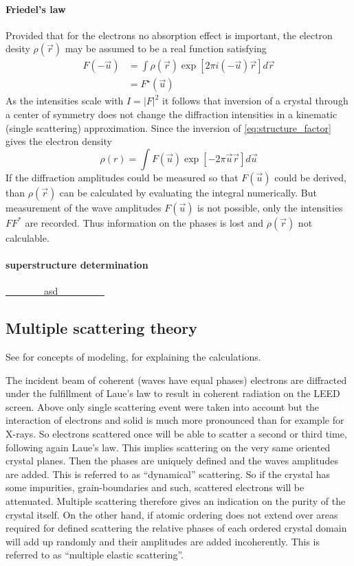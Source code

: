 \paragraph{Friedel's law}\cite[93]{cowley_diffraction_1981}
Provided that for the electrons no absorption effect is important, the electron desity $\rho(\vec r)$ may be assumed to be a real function satisfying \begin{align}
F(-\vec u) &= \int \rho(\vec r) \exp{[2\pi i(-\vec u)\vec r]} d\vec r \\                                                                                                                                                      &=F^\star(\vec u)                                                                                                                                                      \end{align}
As the intensities scale with $I=|F|^2$ it follows that inversion of a crystal through a center of symmetry does not change the diffraction intensities in a kinematic (single scattering) approximation. Since the inversion of \eqref{eq:structure_factor} gives the electron density $$\rho(r)=\int F(\vec u)\exp{[-2\pi \vec u \vec r]} d\vec u$$ If the diffraction amplitudes could be measured so that $F(\vec u)$ could be derived, than $\rho (\vec r)$ can be calculated by evaluating the integral numerically. But measurement of the wave amplitudes $F(\vec  u)$ is not possible, only the intensities $FF^*$ are recorded. Thus information on the phases is lost and $\rho(\vec r)$ not calculable.

\paragraph{superstructure determination}
\underline{\ \ \ \ \ \ \ \ asd \ \ \ \ \ \ \ \ \ }
\subsection{Multiple scattering theory}See \cite[55]{woodruff_modern_1986} for concepts of modeling, \cite{van_hove_surface_1979} for explaining the calculations.

The incident beam of coherent (waves have equal phases) electrons are diffracted under the fulfillment of Laue's law to result in coherent radiation on the LEED screen. Above only single scattering event were taken into account but the interaction of electrons and solid is much more pronounced than for example for X-rays. So electrons scattered once will be able to scatter a second or third time, following again Laue's law. This implies scattering on the very same oriented crystal planes. Then the phases are uniquely defined and the waves amplitudes are added. This is referred to as ``dynamical'' scattering. So if the crystal has some impurities, grain-boundaries and such, scattered electrons will be attenuated. Multiple scattering therefore gives an indication on the purity of the crystal itself. On the other hand, if atomic ordering does not extend over areas required for defined scattering the relative phases of each ordered crystal domain will add up randomly and their amplitudes are added incoherently. This is referred to as ``multiple elastic scattering''.

